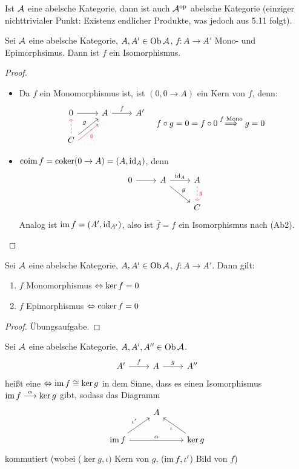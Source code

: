 \begin{anm}
	Ist $\mathcal{A}$ eine abelsche Kategorie, dann ist auch $\mathcal{A}^\text{op}$ abelsche Kategorie (einziger nichttrivialer Punkt: Existenz endlicher Produkte, was jedoch aus 5.11 folgt).
\end{anm}
\begin{sa}\label{5.23}
	Sei $\mathcal{A}$ eine abelsche Kategorie, $A,A' \in \text{Ob}\,\mathcal{A}$, $f:A \to A'$ Mono- und Epimorphsimus. Dann ist $f$ ein Isomorphismus.
\end{sa}
\begin{proof}
	\begin{itemize}
		\item Da $f$ ein Monomorphismus ist, ist $(0, 0 \to A)$ ein Kern von $f$, denn: 
		$$ \begin{tikzcd}
		0 \arrow{r} & A \arrow{r}{f} & A' \\
		C \arrow[dashed, red]{u}\arrow{ur}{g} \arrow[swap, red, yshift = -1.5ex]{ur}{0}& & 
		\end{tikzcd} \quad f\circ g = 0 = f \circ 0 \overset{f \text{ Mono}}{\Longrightarrow} g=0
		$$
		\item $\operatorname{coim} f = \operatorname{coker}(0 \to A) = (A, \operatorname{id}_A)$, denn 
		$$\begin{tikzcd}
		0 \arrow{r} & A \arrow{dr}{g} \arrow{r}{\id_A} & A \arrow[red, dashed]{d}{g}\\
		& & C
		\end{tikzcd}
		$$
		Analog ist $\operatorname{im} f = (A', \operatorname{id}_{A'})$, also ist $\bar f = f $ ein Isomorphismus nach (Ab2).
	\end{itemize}
\end{proof}
\begin{bem}\label{5.24}
	Sei $\mathcal{A}$ eine abelsche Kategorie, $A,A' \in \text{Ob}\,\mathcal{A}$, $f:A \to A'$. Dann gilt:
	\begin{enumerate}[label= \alph*)]
		\item $f$ Monomorphismus $\Leftrightarrow \ker f =0$
		\item $f$ Epimorphismus $\Leftrightarrow \operatorname{coker} f = 0$
	\end{enumerate}
\end{bem}
\begin{proof}
	Übungsaufgabe.
\end{proof}
\begin{df}\label{5.25}
	Sei $\mathcal{A}$ eine abelsche Kategorie, $A,A', A''\in \text{Ob}\,\mathcal{A}$.
	$$\begin{tikzcd}
	A' \arrow{r}{f} & A \arrow{r}{g} & A''
	\end{tikzcd}$$
	heißt eine  $\Leftrightarrow \operatorname{im} f \cong \ker g$ in dem Sinne, dass es einen Isomorphismus
	$\operatorname{im} f \overset{\alpha}{\longrightarrow} \ker g$ gibt, sodass das Diagramm
	$$\begin{tikzcd}
	& A & \\
	\im f \arrow{ur}{\iota'} \arrow{rr}{\alpha} & & \ker g \arrow{ul}{\iota}
	\end{tikzcd}$$
	kommutiert (wobei ($\ker g, \iota)$ Kern von $g$, ($\operatorname{im} f, \iota'$) Bild von $f$)
\end{df}
